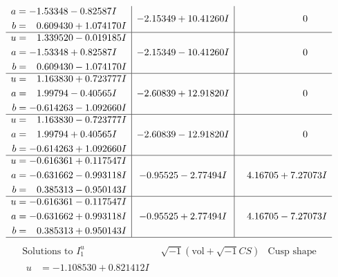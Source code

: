 \documentclass[1p]{elsarticle_modified}
\theoremstyle{definition}
\newcommand{\I}{\sqrt{-1}}
\begin{document}
$$\begin{array}{c|c|c}
\begin{aligned}
a &= -1.53348 - 0.82587 I \\
b &= \phantom{-}0.609430 + 1.074170 I\end{aligned}
 & -2.15349 + 10.41260 I & \phantom{-0.000000 } 0 \\ \hline\begin{aligned}
u &= \phantom{-}1.339520 - 0.019185 I \\
a &= -1.53348 + 0.82587 I \\
b &= \phantom{-}0.609430 - 1.074170 I\end{aligned}
 & -2.15349 - 10.41260 I & \phantom{-0.000000 } 0 \\ \hline\begin{aligned}
u &= \phantom{-}1.163830 + 0.723777 I \\
a &= \phantom{-}1.99794 - 0.40565 I \\
b &= -0.614263 - 1.092660 I\end{aligned}
 & -2.60839 + 12.91820 I & \phantom{-0.000000 } 0 \\ \hline\begin{aligned}
u &= \phantom{-}1.163830 - 0.723777 I \\
a &= \phantom{-}1.99794 + 0.40565 I \\
b &= -0.614263 + 1.092660 I\end{aligned}
 & -2.60839 - 12.91820 I & \phantom{-0.000000 } 0 \\ \hline\begin{aligned}
u &= -0.616361 + 0.117547 I \\
a &= -0.631662 - 0.993118 I \\
b &= \phantom{-}0.385313 - 0.950143 I\end{aligned}
 & -0.95525 - 2.77494 I & \phantom{-}4.16705 + 7.27073 I \\ \hline\begin{aligned}
u &= -0.616361 - 0.117547 I \\
a &= -0.631662 + 0.993118 I \\
b &= \phantom{-}0.385313 + 0.950143 I\end{aligned}
 & -0.95525 + 2.77494 I & \phantom{-}4.16705 - 7.27073 I\\
 \hline 
 \end{array}$$\newpage$$\begin{array}{c|c|c}  
\text{Solutions to }I^u_{1}& \I (\text{vol} + \sqrt{-1}CS) & \text{Cusp shape}\\
 \hline 
\begin{aligned}
u &= -1.108530 + 0.821412 I \\

\end{aligned}
\end{array}$$
\end{document}

